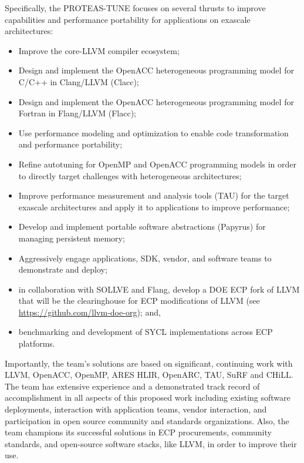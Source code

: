 Specifically, the PROTEAS-TUNE focuses on several thrusts to improve capabilities and performance portability for applications on exascale architectures: 

\begin{itemize}
\item 
    Improve the core-LLVM compiler ecosystem; 
\item 
	Design and implement the OpenACC heterogeneous programming model for C/C++ in Clang/LLVM (Clacc);
\item 
    Design and implement the OpenACC heterogeneous programming model for Fortran in Flang/LLVM (Flacc);  
    
\item 
	Use performance modeling and optimization to enable code transformation and performance portability;
\item 
	Refine autotuning for OpenMP and OpenACC programming models in order to directly target challenges with heterogeneous architectures;
\item 
    Improve performance measurement and analysis tools (TAU) for the target exascale architectures and apply it to applications to improve performance;
\item 
    Develop and implement portable software abstractions (Papyrus) for managing persistent memory;
\item 
    Aggressively engage applications, SDK, vendor, and software teams to demonstrate and deploy;
\item
    in collaboration with SOLLVE and Flang, develop a DOE ECP fork of LLVM that will be the clearinghouse for ECP modifications of LLVM  (see \url{https://github.com/llvm-doe-org}); and,
\item
    benchmarking and development of SYCL implementations across ECP platforms.
    
\end{itemize}

Importantly, the team’s solutions are based on significant, continuing work with LLVM, OpenACC, OpenMP, ARES HLIR, OpenARC, TAU, SuRF and CHiLL. The team has extensive experience and a demonstrated track record of accomplishment in all aspects of this proposed work including existing software deployments, interaction with application teams, vendor interaction, and participation in open source community and standards organizations. Also, the team champions its successful solutions in ECP procurements, community standards, and open-source software stacks, like LLVM, in order to improve their use.

